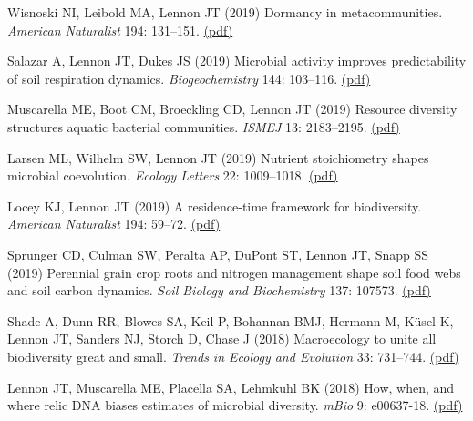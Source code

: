 \documentclass[11pt]{article}
\begin{document}
\begin{etaremune}
\item Wisnoski NI, Leibold MA, Lennon JT (2019) Dormancy in metacommunities. \textit{American Naturalist} 194: 131--151. \href{https://lennonlab.github.io/assets/publications/Wisnoski_etal_2019.pdf}{(pdf)}

\item Salazar A, Lennon JT, Dukes JS (2019) Microbial activity improves predictability of soil respiration dynamics. \textit{Biogeochemistry} 144: 103--116. \href{https://lennonlab.github.io/assets/publications/Salazar_etal_2019.pdf}{(pdf)}

\item Muscarella ME, Boot CM, Broeckling CD, Lennon JT (2019) Resource diversity structures aquatic bacterial communities. \textit{ISMEJ} 13: 2183--2195. \href{https://lennonlab.github.io/assets/publications/Muscarella_etal_2019.pdf}{(pdf)}

\item Larsen ML, Wilhelm SW, Lennon JT (2019) Nutrient stoichiometry shapes microbial coevolution. \textit{Ecology Letters} 22: 1009--1018. \href{https://lennonlab.github.io/assets/publications/Larsen_etal_2019.pdf}{(pdf)}

\item Locey KJ, Lennon JT (2019) A residence-time framework for biodiversity. \textit{American Naturalist} 194: 59--72. \href{https://lennonlab.github.io/assets/publications/Locey_Lennon_2019.pdf}{(pdf)}

\item Sprunger CD, Culman SW, Peralta AP, DuPont ST, Lennon JT, Snapp SS (2019) Perennial grain crop roots and nitrogen management shape soil food webs and soil carbon dynamics. \textit{Soil Biology and Biochemistry} 137: 107573. \href{https://lennonlab.github.io/assets/publications/Sprunger_etal_2019.pdf}{(pdf)}

\item Shade A, Dunn RR, Blowes SA, Keil P, Bohannan BMJ, Hermann M, Küsel K, Lennon JT, Sanders NJ, Storch D, Chase J (2018) Macroecology to unite all biodiversity great and small. \textit{Trends in Ecology and Evolution} 33: 731--744. \href{https://lennonlab.github.io/assets/publications/Shade_etal_2018.pdf}{(pdf)}

\item Lennon JT, Muscarella ME, Placella SA, Lehmkuhl BK (2018) How, when, and where relic DNA biases estimates of microbial diversity. \textit{mBio} 9: e00637-18. \href{https://lennonlab.github.io/assets/publications/Lennon_etal_2018.pdf}{(pdf)}


\end{etaremune}
\end{document}
